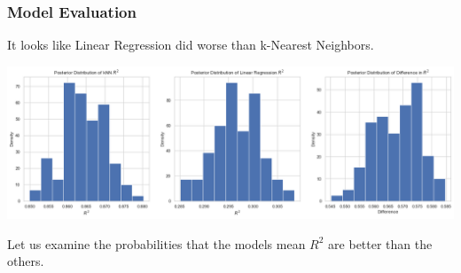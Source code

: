 \documentclass{beamer}
\begin{document}
	\begin{frame}
	\frametitle{Model Evaluation}
	It looks like Linear Regression did worse than k-Nearest Neighbors.  \par
	\includegraphics[width=1.\textwidth]{images/compare knn lr.png}  \par
	Let us examine the probabilities that the models mean $R^2$ are better than the others.  \par
		\begin{tiny}
	\begin{columns}


\end{columns}
\end{tiny}
\end{frame}
\end{document}
